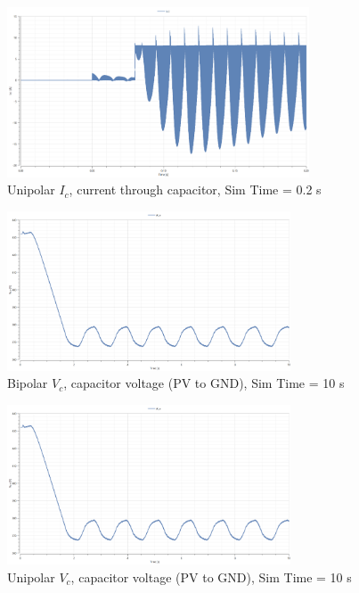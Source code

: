\documentclass[12pt,twoside]{scrartcl}
\begin{document}
\begin{figure}[htp]
    \centering
    \includegraphics[width=0.8\textwidth]{Unipolar_Ic_0.2.png}
    \caption{Unipolar $I_c$, current through capacitor, Sim Time = 0.2 s}
    \label{fig:UnipolarIc0.2}
\end{figure}
\begin{figure}[htp]
    \centering
    \includegraphics[width=0.75\textwidth]{Bipolar_Vc_10.png}
    \caption{Bipolar $V_c$, capacitor voltage (PV to GND), Sim Time = 10 s}
    \label{fig:BipolarVc10}
\end{figure}
\begin{figure}[htp]
    \centering
    \includegraphics[width=0.75\textwidth]{Unipolar_Vc_10.png}
    \caption{Unipolar $V_c$, capacitor voltage (PV to GND), Sim Time = 10 s}
    \label{fig:UnipolarVc10}
\end{figure}
\end{document}
